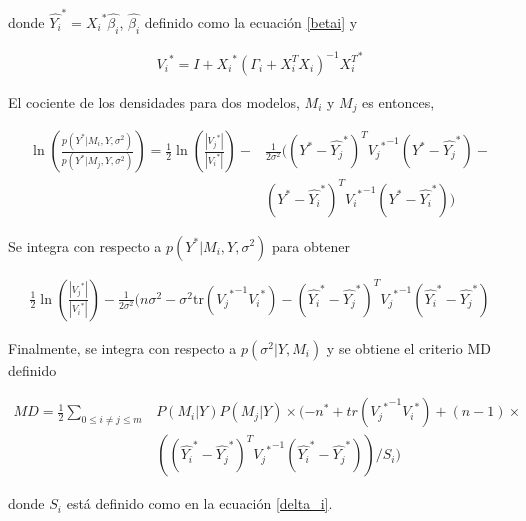 \noindent donde $\hat{{Y_i}}^{*} = {X_i}^{*} \hat{\beta_i}$, $\hat{\beta_i}$ definido como la ecuación \ref{betai} y 

\begin{equation} \label{vi_vj}
	\begin{aligned}
	{V_i}^{*} = I + {X_i}^{*}(\Gamma_i + X_i^{T}X_i)^{-1} {X_i^{T}}^{*}
	\end{aligned}
\end{equation}

\noindent El cociente de los densidades para dos modelos, $M_i$ y $M_j$ es entonces, 

\begin{equation*}
	\begin{aligned}
		\ln \left (\frac{p(Y^{*} | M_i, Y, \sigma^{2})}{p(Y^{*}| M_j, Y, \sigma^{2})} \right ) =  \frac{1}{2} \ln \left (\frac{|{V_j}^{*}|}{|{V_i}^{*}|} \right ) - &
		 \frac{1}{2 \sigma^{2}} ((Y^{*} - \hat{{Y_j}}^{*})^{T} {{V_j}^{*}}^{-1}(Y^{*} - \hat{{Y_j}}^{*}) - \\
		 & (Y^{*} - \hat{{Y_i}}^{*})^{T}{{V_i}^{*}}^{-1}(Y^{*} - \hat{{Y_i}}^{*}))
	\end{aligned}
\end{equation*}

Se integra con respecto a $p(Y^{*} | M_i, Y, \sigma^{2})$ para obtener

\begin{equation*}
	\begin{aligned}
		\frac{1}{2} \ln(\frac{|{V_j}^{*}|}{|{V_i}^{*}|}) - \frac{1}{2 \sigma^{2}}(n\sigma^{2} - \sigma^{2}\text{tr}({{V_j}^{*}}^{-1}{V_i}^{*}) - (\hat{{Y_i}}^{*} - \hat{{Y_j}}^{*})^{T}{{V_j}^{*}}^{-1}(\hat{{Y_i}}^{*} - \hat{{Y_j}}^{*})
	\end{aligned}
\end{equation*}

Finalmente, se integra con respecto a $p(\sigma^{2} | Y, M_i)$ y se obtiene el criterio MD definido 

\begin{equation} \label{formula_MD}
	\begin{aligned}
		MD =  \frac{1}{2} \sum_{0 \leq i \neq j \leq m} & P(M_i | Y)  P(M_j | Y) \times  (-n^{*} + tr({{V_j}^{*}}^{-1}{V_i}^{*}) + (n-1) \times \\
		& ((\hat{{Y_i}}^{*}-\hat{{Y_j}}^{*})^{T}{{V_j}^{*}}^{-1}(\hat{{Y_i}}^{*} - \hat{{Y_j}}^{*}))/S_i)
	\end{aligned}
\end{equation}

\noindent donde $S_i$ está definido como en la ecuación \ref{delta_i}. 

